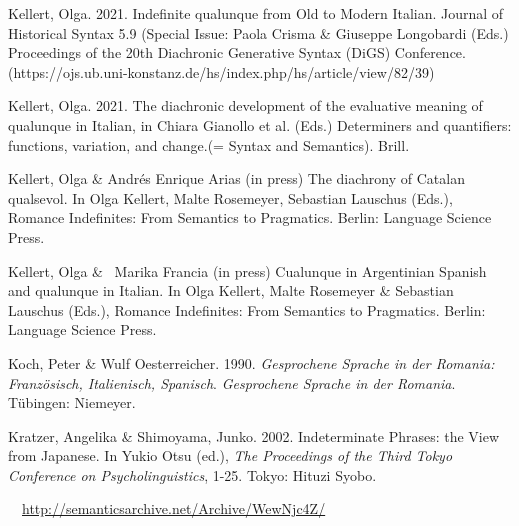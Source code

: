 \begin{styleStandard}
Kellert, Olga. 2021. Indefinite qualunque from Old to Modern Italian. Journal of Historical Syntax 5.9 (Special Issue: Paola Crisma \& Giuseppe Longobardi (Eds.) Proceedings of the 20th Diachronic Generative Syntax (DiGS) Conference. (https://ojs.ub.uni-konstanz.de/hs/index.php/hs/article/view/82/39)
\end{styleStandard}

\begin{styleStandard}
Kellert, Olga. 2021. The diachronic development of the evaluative meaning of qualunque in Italian, in Chiara Gianollo et al. (Eds.) Determiners and quantifiers: functions, variation, and change.(= Syntax and Semantics). Brill.
\end{styleStandard}

\begin{styleStandard}
Kellert, Olga \& Andrés Enrique Arias (in press) The diachrony of Catalan qualsevol. In Olga Kellert, Malte Rosemeyer, Sebastian Lauschus (Eds.), Romance Indefinites: From Semantics to Pragmatics. Berlin: Language Science Press.
\end{styleStandard}

\begin{styleStandard}
Kellert, Olga \& \ Marika Francia (in press) Cualunque in Argentinian Spanish and qualunque in Italian. In Olga Kellert, Malte Rosemeyer \& Sebastian Lauschus (Eds.), Romance Indefinites: From Semantics to Pragmatics. Berlin: Language Science Press.
\end{styleStandard}

\begin{styleStandard}
Koch, Peter \& Wulf Oesterreicher. 1990. \textit{Gesprochene Sprache in der Romania: Französisch, Italienisch, Spanisch}. \textit{Gesprochene Sprache in der Romania}. T\"{u}bingen: Niemeyer.
\end{styleStandard}

\begin{styleStandard}
Kratzer, Angelika \& Shimoyama, Junko. 2002. Indeterminate Phrases: the View from Japanese. In Yukio Otsu (ed.), \textit{The Proceedings of the Third Tokyo Conference on Psycholinguistics}, 1-25. Tokyo: Hituzi Syobo.
\end{styleStandard}

\begin{styleStandard}
\ \ \url{http://semanticsarchive.net/Archive/WewNjc4Z/}
\end{styleStandard}

